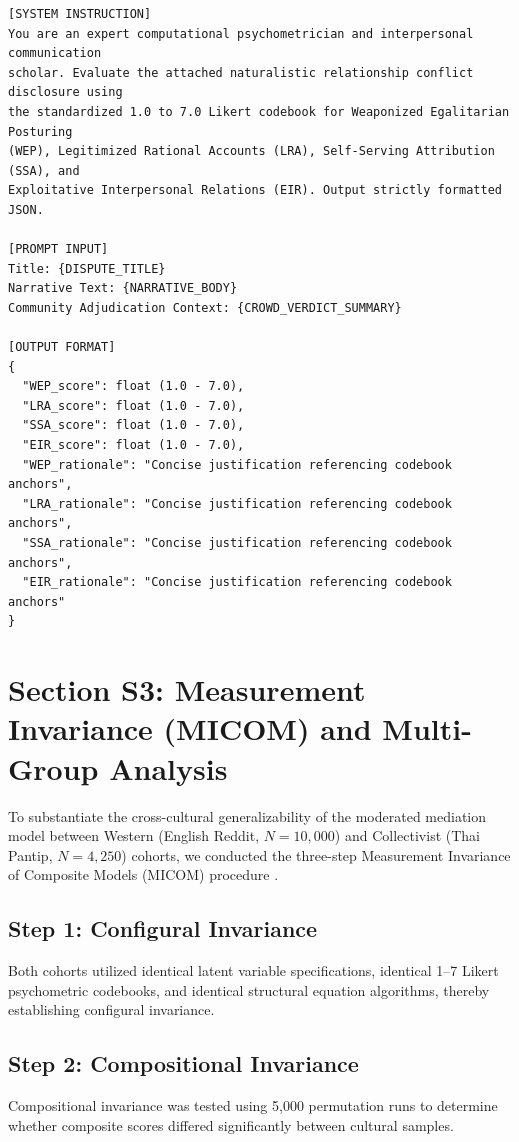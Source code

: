\documentclass[11pt,a4paper]{article}
\begin{document}
\begin{small}
\begin{verbatim}
[SYSTEM INSTRUCTION]
You are an expert computational psychometrician and interpersonal communication 
scholar. Evaluate the attached naturalistic relationship conflict disclosure using 
the standardized 1.0 to 7.0 Likert codebook for Weaponized Egalitarian Posturing 
(WEP), Legitimized Rational Accounts (LRA), Self-Serving Attribution (SSA), and 
Exploitative Interpersonal Relations (EIR). Output strictly formatted JSON.

[PROMPT INPUT]
Title: {DISPUTE_TITLE}
Narrative Text: {NARRATIVE_BODY}
Community Adjudication Context: {CROWD_VERDICT_SUMMARY}

[OUTPUT FORMAT]
{
  "WEP_score": float (1.0 - 7.0),
  "LRA_score": float (1.0 - 7.0),
  "SSA_score": float (1.0 - 7.0),
  "EIR_score": float (1.0 - 7.0),
  "WEP_rationale": "Concise justification referencing codebook anchors",
  "LRA_rationale": "Concise justification referencing codebook anchors",
  "SSA_rationale": "Concise justification referencing codebook anchors",
  "EIR_rationale": "Concise justification referencing codebook anchors"
}
\end{verbatim}
\end{small}

\newpage
\section{Section S3: Measurement Invariance (MICOM) and Multi-Group Analysis}
\label{sec:supp_micom}

To substantiate the cross-cultural generalizability of the moderated mediation model between Western (English Reddit, $N = 10,000$) and Collectivist (Thai Pantip, $N = 4,250$) cohorts, we conducted the three-step Measurement Invariance of Composite Models (MICOM) procedure \citep{henseler2016testing,hair2019use}.

\subsection{Step 1: Configural Invariance}
Both cohorts utilized identical latent variable specifications, identical 1--7 Likert psychometric codebooks, and identical structural equation algorithms, thereby establishing configural invariance.

\subsection{Step 2: Compositional Invariance}
Compositional invariance was tested using 5,000 permutation runs to determine whether composite scores differed significantly between cultural samples.
\end{document}
